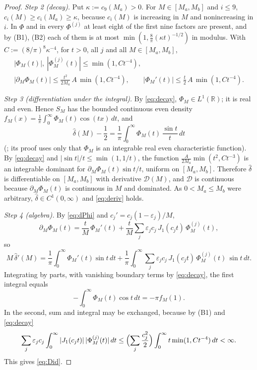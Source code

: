 \documentclass[11pt]{amsart}
\theoremstyle{definition}
\numberwithin{equation}{section}
\newcommand{\eps}{\varepsilon}
\newcommand{\hd}{\widehat\delta}
\begin{document}
\begin{proof}
\emph{Step 2 (decay).} Put $\kappa:=c_9(M_a)>0$. For
$M\in[M_a,M_b]$ and $i\le9$, $c_i(M)\ge c_i(M_a)\ge\kappa$, because
$c_i(M)$ is increasing in $M$ and nonincreasing in $i$. In $\Phi$ and
in every $\Phi^{(j)}$ at least eight of the first nine factors are
present, and by (B1), (B2) each of them is at most
$\min(1,\frac8\pi(\kappa t)^{-1/2})$ in modulus. With
$C:=(8/\pi)^8\kappa^{-4}$, for $t>0$, all $j$ and all
$M\in[M_a,M_b]$,
\begin{equation}\label{eq:decay}
\begin{gathered}
|\Phi_M(t)|,\ |\Phi_M^{(j)}(t)|\le\min(1,Ct^{-4}),\\
|\partial_M\Phi_M(t)|\le\frac{t^2}{2M_a}\,A\,\min(1,Ct^{-4}),\qquad
|\Phi_M'(t)|\le\frac t2\,A\,\min(1,Ct^{-4}).
\end{gathered}
\end{equation}

\emph{Step 3 (differentiation under the integral).} By
\eqref{eq:decay}, $\Phi_M\in L^1(\mathbb R)$; it is real and even.
Hence $S_M$ has the bounded continuous even density
$f_M(x)=\frac1\pi\int_0^\infty\Phi_M(t)\cos(tx)\,dt$, and
\[
\hd(M)-\frac12=\frac1\pi\int_0^\infty\Phi_M(t)\,\frac{\sin t}{t}\,dt
\]
(\cite[Lemma~7(b)]{WR}; its proof uses only that $\Phi_M$ is an
integrable real even characteristic function). By \eqref{eq:decay}
and $|\sin t|/t\le\min(1,1/t)$, the function
$\frac{A}{2M_a}\min(t^2,Ct^{-3})$ is an integrable dominant for
$\partial_M\Phi_M(t)\sin t/t$, uniform on $[M_a,M_b]$. Therefore
$\hd$ is differentiable on $[M_a,M_b]$ with derivative
$\mathcal D(M)$, and $\mathcal D$ is continuous because
$\partial_M\Phi_M(t)$ is continuous in $M$ and dominated. As
$0<M_a\le M_b$ were arbitrary, $\hd\in C^1(0,\infty)$ and
\eqref{eq:deriv} holds.

\emph{Step 4 (algebra).} By \eqref{eq:dPhi} and
$c_j'=c_j(1-\eps_j)/M$,
\[
\partial_M\Phi_M(t)=\frac tM\,\Phi_M'(t)
+\frac tM\sum_j\eps_jc_j\,J_1(c_jt)\,\Phi_M^{(j)}(t),
\]
so
\[
M\,\hd'(M)=\frac1\pi\int_0^\infty\Phi_M'(t)\sin t\,dt
+\frac1\pi\int_0^\infty\sum_j\eps_jc_j\,J_1(c_jt)\,\Phi_M^{(j)}(t)\,\sin t\,dt .
\]
Integrating by parts, with vanishing boundary terms by
\eqref{eq:decay}, the first integral equals
\[
-\int_0^\infty\Phi_M(t)\cos t\,dt=-\pi f_M(1).
\]
In the second, sum and integral may be exchanged, because by (B1) and \eqref{eq:decay}
\[
\sum_j\eps_jc_j\int_0^\infty|J_1(c_jt)|\,|\Phi_M^{(j)}(t)|\,dt
\le\Bigl(\sum_j\frac{c_j^2}{2}\Bigr)\int_0^\infty t\min(1,Ct^{-4})\,dt<\infty .
\]
This gives \eqref{eq:Did}.
\end{proof}
\end{document}
